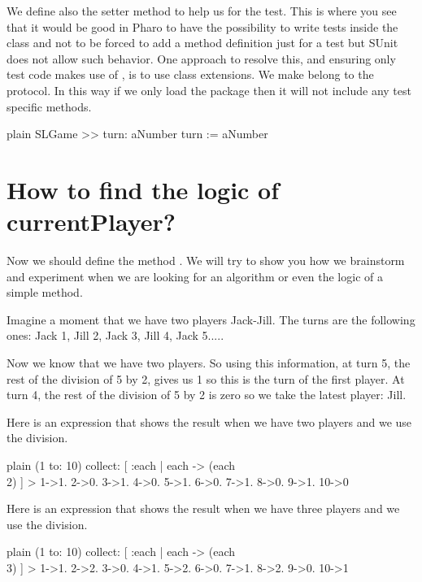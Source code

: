 \documentclass[10pt,twoside,english]{_support/latex/sbabook/sbabook}
\begin{document}
We define also the setter method  to help us for the test. This is where you see that 
it would be good in Pharo to have the possibility to write tests inside the class and not to be forced to add a method definition just for a test but SUnit does not allow such behavior.
One approach to resolve this, and ensuring only test code makes use of , is to use class extensions. We make  belong to the  protocol. 
In this way if we only load the  package then it will not include any test specific methods.

\begin{displaycode}{plain}
SLGame >> turn: aNumber
	turn := aNumber
\end{displaycode}
\section{How to find the logic of currentPlayer?}
Now we should define the method . We will try to show you how we brainstorm and experiment when we are looking for an algorithm or even the logic of a simple method. 

Imagine a moment that we have two players Jack-Jill. The turns are the following ones: Jack 1, Jill 2, Jack 3, Jill 4, Jack 5.....

Now we know that we have two players. So using this information, 
at turn 5, the rest of the division of 5 by 2, gives us 1 so this is the turn of the first player. At turn 4, the rest of the division of 5 by 2 is zero so we take the latest player: Jill. 

Here is an expression that shows the result when we have two players and we use the division. 

\begin{displaycode}{plain}
(1 to: 10) collect: [ :each | each -> (each \\ 2) ] 
> {1->1. 2->0. 3->1. 4->0. 5->1. 6->0. 7->1. 8->0. 9->1. 10->0}
\end{displaycode}

Here is an expression that shows the result when we have three players and we use the division. 

\begin{displaycode}{plain}
(1 to: 10) collect: [ :each | each -> (each \\ 3) ] 
> {1->1. 2->2. 3->0. 4->1. 5->2. 6->0. 7->1. 8->2. 9->0. 10->1}
\end{displaycode}
\end{document}
